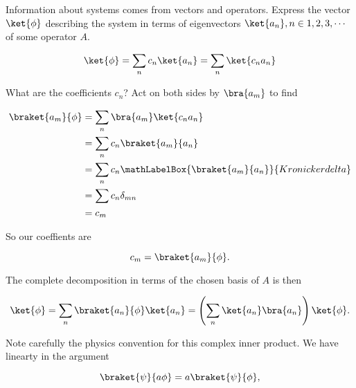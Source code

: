 %
%
%

Information about systems comes from vectors and operators.  Express the vector \(\ket{\phi}\) describing the system in terms of eigenvectors \(\ket{a_n}, n \in 1,2,3,\cdots\) of some operator \(A\).

\begin{equation}\label{eqn:PHY356FLecture10:51}
\ket{\phi} = \sum_n c_n \ket{a_n} = \sum_n \ket{c_n a_n}
\end{equation}

What are the coefficients \(c_n\)?  Act on both sides by \(\bra{a_m}\) to find

\begin{equation}\label{eqn:lecture5BigReviewCh1Formalism:71}
\begin{aligned}
\braket{a_m}{\phi}
&= \sum_n \bra{a_m} \ket{ c_n a_n } \\
&= \sum_n c_n \braket{a_m}{ a_n } \\
&= \sum_n c_n 
\mathLabelBox{\braket{a_m}{a_n}}{Kronicker delta}
\\
&= \sum c_n \delta_{mn} \\
&= c_m
\end{aligned}
\end{equation}

So our coeffients are

\begin{equation}\label{eqn:PHY356FLecture10:51c}
c_m = \braket{a_m}{\phi}.
\end{equation}

The complete decomposition in terms of the chosen basis of \(A\) is then

\begin{equation}\label{eqn:PHY356FLecture10:51b}
\ket{\phi} = \sum_n \braket{a_n}{\phi} \ket{a_n}
= \left( \sum_n \ket{a_n} \bra{a_n} \right) \ket{\phi}.
\end{equation}

Note carefully the physics convention for this complex inner product.  We have linearty in the  argument

\begin{equation}\label{eqn:PHY356FLecture10:51e}
\braket{\psi}{a \phi} = a \braket{\psi}{\phi},
\end{equation}

